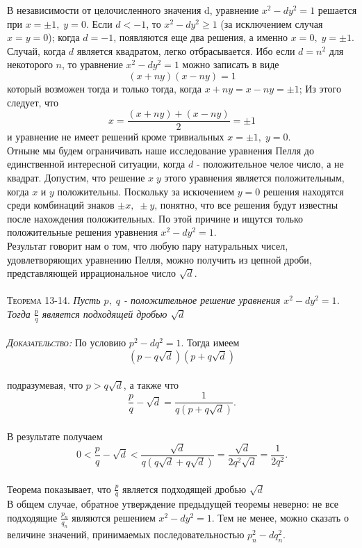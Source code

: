 \documentclass[twoside,12pt]{article}
\begin{document}
\indent В независимости от целочисленного значения d, уравнение $x^2 - dy^2 = 1 $ решается при $x = \pm 1,\; y = 0 $. Если $d < -1$, то $x^2 - dy^2 \geq 1 $ (за исключением случая $x = y = 0 $); когда $d = -1 $, появляются еще два решения, а именно $x=0,\; y = \pm 1 $. Случай, когда $d$ является квадратом, легко отбрасывается.  Ибо если  $d = n^2$ для некоторого $n$, то уравнение $x^2 - dy^2 = 1$ можно записать в виде 
$$(x + ny)(x-ny)=1 $$ 
\noindent который возможен тогда и только тогда, когда $x+ny=x-ny=\pm 1$; Из этого следует, что 
$$x=\frac{(x + ny) + (x - ny) }{2} =\pm 1$$
\noindent и уравнение не имеет решений кроме тривиальных $x = \pm 1, \; y = 0$.\\
\indent Отныне мы будем ограничивать наше исследование уравнения Пелля до единственной интересной ситуации, когда $d$ - положительное челое число, а не квадрат. Допустим, что решение $x \; y$ этого уравнения является положительным, когда $x$ и $y$ положительны. Поскольку за искючением $y=0$ решения находятся среди комбинаций знаков $\pm x, \; \pm y $, понятно, что все решения будут известны после нахождения положительных. По этой причине и ищутся только положительные решения уравнения $x^2 - dy^2 = 1$.\\
\indent Результат говорит нам о том, что любую пару натуральных чисел, удовлетворяющих уравнению Пелля, можно получить из цепной дроби, представляющей иррациональное число $\sqrt d$.\\ \\
\noindent \textsc{Теорема 13-14. }
\textit{Пусть $p,\; q$ - положительное решение уравнения $x^2 - dy^2 = 1$. Тогда $\frac{p}{q}$ является подходящей дробью $\sqrt{d} $} \\ \\
\noindent \textsc{\textit{Доказательство:}} По условию $p^2 - dq^2 = 1$. Тогда имеем 
$$(p-q\sqrt{d})(p+q\sqrt{d}) $$ \\
\noindent подразумевая, что $p>q\sqrt{d}$, а также что
$$ \frac{p}{q} - \sqrt{d} = \frac{1}{q(p + q\sqrt{d})}.$$\\
В результате получаем
$$ 0 < \frac{p}{q} - \sqrt{d} < \frac{\sqrt{d}}{q(q\sqrt{d} +q\sqrt{d})} = \frac{\sqrt{d}}{2q^2\sqrt{d}} = \frac{1}{2q^2}.$$\\
\noindent Теорема показывает, что $\frac{p}{q}$ является подходящей дробью $\sqrt{d} $ \\
\indent В общем случае, обратное утверждение предыдущей теоремы неверно: не все подходящие $\frac{p_n}{q_n}$ являются решением $x^2 - dy^2 = 1$. Тем не менее, можно сказать о величине значений, принимаемых последовательностью $p_n^2 - dq_n^2.$\\ \\
\end{document}
